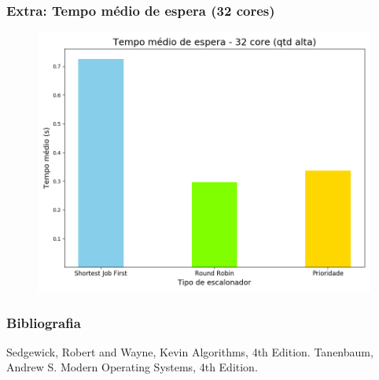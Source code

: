 \documentclass{beamer}
\begin{document}
\begin{frame}
\frametitle{Extra: Tempo médio de espera (32 cores)}
\begin{figure}
\includegraphics[scale=0.4]{avgwt_long_32.png}
\end{figure}
\end{frame}

\begin{frame}
\frametitle{Bibliografia}
\footnotesize {
\begin{thebibliography}{99} %
 Sedgewick, Robert and Wayne, Kevin
\newblock Algorithms, 4th Edition.
 Tanenbaum, Andrew S.
\newblock Modern Operating Systems, 4th Edition.
\end{thebibliography}
}
	\end{frame}
\end{document}
